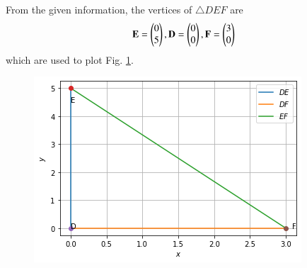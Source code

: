From the given information,  the vertices of $\triangle DEF$ are
\begin{align}
\mathbf{E} = \begin{pmatrix}0\\5\end{pmatrix}, \mathbf{D} = \begin{pmatrix}0\\0\end{pmatrix}, \mathbf{F} = \begin{pmatrix}3\\0\end{pmatrix}
\end{align}
which are used to plot Fig. \ref{constr/15/fig:DEF}.
\begin{figure}[ht]
    \centering
    \includegraphics[width=\columnwidth]{solutions/15/Fig.png}
    \caption{}
    \label{constr/15/fig:DEF}
\end{figure}


